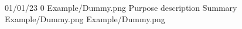{01/01/23} %
{0} %
{Example/Dummy.png} %
{Purpose description}
{Summary
} 
{Example/Dummy.png} %
{Example/Dummy.png} %